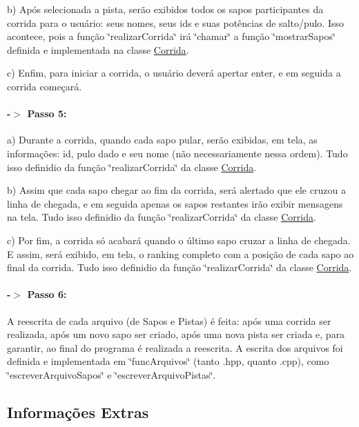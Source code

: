 b) Após selecionada a pista, serão exibidos todos os sapos participantes da corrida para o usuário\+: seus nomes, seus id\textquotesingle{}s e suas potências de salto/pulo. Isso acontece, pois a função \char`\"{}realizar\+Corrida\char`\"{} irá \char`\"{}chamar\char`\"{} a função \char`\"{}mostrar\+Sapos\char`\"{} definida e implementada na classe \hyperlink{classCorrida}{Corrida}. 

c) Enfim, para iniciar a corrida, o usuário deverá apertar enter, e em seguida a corrida começará.

\paragraph*{-\/$>$ Passo 5\+:}

a) Durante a corrida, quando cada sapo pular, serão exibidas, em tela, as informações\+: id, pulo dado e seu nome (não necessariamente nessa ordem). Tudo isso definidio da função \char`\"{}realizar\+Corrida\char`\"{} da classe \hyperlink{classCorrida}{Corrida}. 

b) Assim que cada sapo chegar ao fim da corrida, será alertado que ele cruzou a linha de chegada, e em seguida apenas os sapos restantes irão exibir mensagens na tela. Tudo isso definidio da função \char`\"{}realizar\+Corrida\char`\"{} da classe \hyperlink{classCorrida}{Corrida}. 

c) Por fim, a corrida só acabará quando o último sapo cruzar a linha de chegada. E assim, será exibido, em tela, o ranking completo com a posição de cada sapo ao final da corrida. Tudo isso definidio da função \char`\"{}realizar\+Corrida\char`\"{} da classe \hyperlink{classCorrida}{Corrida}.

\paragraph*{-\/$>$ Passo 6\+:}

A reescrita de cada arquivo (de Sapos e Pistas) é feita\+: após uma corrida ser realizada, após um novo sapo ser criado, após uma nova pista ser criada e, para garantir, ao final do programa é realizada a reescrita. A escrita dos arquivos foi definida e implementada em \char`\"{}func\+Arquivos\char`\"{} (tanto .hpp, quanto .cpp), como \char`\"{}escrever\+Arquivo\+Sapos\char`\"{} e \char`\"{}escrever\+Arquivo\+Pistas\char`\"{}.

\subsection*{Informações Extras}

